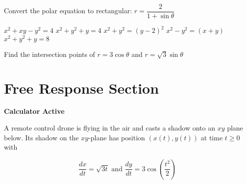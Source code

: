 \documentclass[11pt,answers]{exam}
\begin{document}
\begin{questions}
\begin{minipage}{\linewidth}
\question Convert the polar equation to rectangular: $r = \dfrac{2}{1 + \sin \theta}$

\begin{choices}
	\choice $x^2 + xy - y^2 = 4$
	\choice $x^2+y^2 + y = 4$
	\correctchoice $x^2 + y^2 = (y-2)^2$
	\choice $x^2 - y^2 = (x+y)$
	\choice $x^2+y^2 + y = 8$
\end{choices} \answerline
\end{minipage}

\begin{minipage}{\linewidth}


\question Find the intersection points of $r = 3 \cos \theta$ and $r = \sqrt3 \sin \theta$

\begin{choices}

\end{choices} \answerline
\end{minipage}

\end{questions}

\clearpage
\section*{Free Response Section}
\noindent
\textbf{Calculator Active}
\vspace{2ex}

A remote control drone is flying in the air and casts a shadow onto
an $xy$ plane below. Its shadow on the $x y$-plane has position
$(x(t), y(t))$ at time $t \geq 0$ with

$$
\frac{d x}{d t}=\sqrt{3 t} \text { and } \frac{d y}{d t}=3
\cos \left(\frac{t^{2}}{2}\right)
$$
\end{document}
